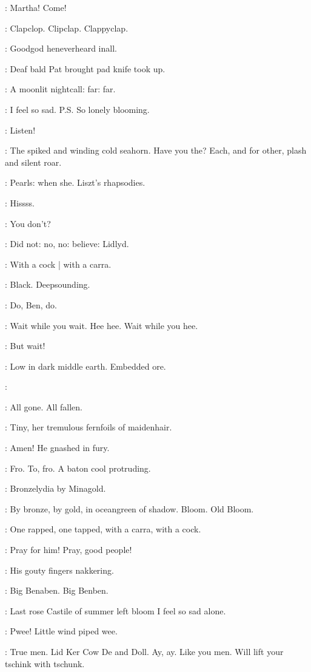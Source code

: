 \BloomInt:
Martha!
Come!

:
Clapclop.
Clipclap.
Clappyclap.

\BloomInt:
Goodgod heneverheard inall.

:
Deaf bald Pat brought pad knife
took up.

\BloomInt:
A moonlit nightcall:
far:
far.

\BloomInt:
I feel so sad.
P.S. So lonely blooming.

:
Listen!

\BloomInt:
The spiked and winding cold seahorn.
Have you the?
Each,
and for other,
plash and silent roar.

\BloomInt:
Pearls:
when she.
Liszt's rhapsodies.

:
Hissss.

\BloomInt:
You don't?

\BloomInt:
Did not:
no, no:
believe:
Lidlyd.

:
With a cock |
with a carra.

\BloomInt:
Black.
Deepsounding.

\simon:
Do, Ben, do.

\BloomInt:
Wait while you wait.
Hee hee.
Wait while you hee.

\BloomInt:
But wait!

\BloomInt:
Low in dark middle earth.
Embedded ore.

\BloomInt:

\BloomInt:
All gone.
All fallen.

\BloomInt:
Tiny,
her tremulous fernfoils of maidenhair.

:
Amen!
He gnashed in fury.

:
Fro.
To, fro.
A baton cool protruding.

\BloomInt:
Bronzelydia by Minagold.

:
By bronze,
by gold,
in oceangreen of shadow.
Bloom.
Old Bloom.

:
One rapped,
one tapped,
with a carra,
with a cock.

\BloomInt:
Pray for him!
Pray, good people!

\dollard:
His gouty fingers nakkering.

\simon:
Big Benaben.
Big Benben.

\BloomInt:
Last rose Castile of summer left bloom I feel so sad alone.

\BloomInt:
Pwee!
Little wind piped wee.

\BloomInt:
True men.
Lid Ker Cow De and Doll.
Ay, ay.
Like you men.
Will lift your tschink with tschunk.

